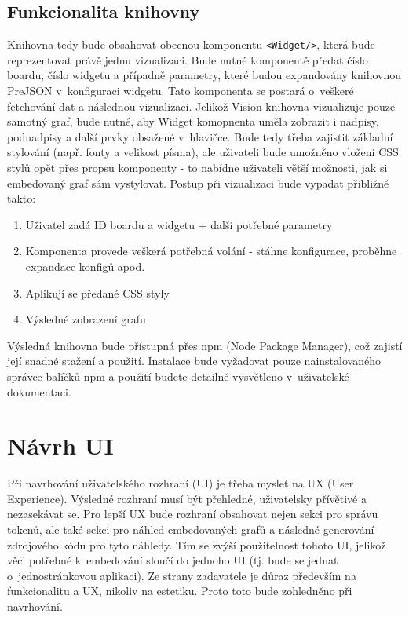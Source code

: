 \documentclass[czech, bc, kiv, he, iso690numb]{fasthesis}
\begin{document}
\subsection{Funkcionalita knihovny}
Knihovna tedy bude obsahovat obecnou komponentu \texttt{<Widget/>}, která bude reprezentovat právě jednu vizualizaci. Bude nutné komponentě předat číslo boardu, číslo widgetu a případně parametry, které 
budou expandovány knihovnou PreJSON v~konfiguraci widgetu. Tato komponenta se postará o~veškeré fetchování dat a následnou vizualizaci. Jelikož Vision knihovna vizualizuje pouze samotný graf, bude nutné, aby
Widget komopnenta uměla zobrazit i nadpisy, podnadpisy a další prvky obsažené v~hlavičce. Bude tedy třeba zajistit základní stylování (např. fonty a velikost písma), ale uživateli bude umožněno vložení CSS stylů
opět přes propsu komponenty - to nabídne uživateli větší možnosti, jak si embedovaný graf sám vystylovat. Postup při vizualizaci bude vypadat přibližně takto:

\begin{enumerate}
	\item Uživatel zadá ID boardu a widgetu + další potřebné parametry
	\item Komponenta provede veškerá potřebná volání - stáhne konfigurace, proběhne expandace konfigů apod.
	\item Aplikují se předané CSS styly 
	\item Výsledné zobrazení grafu
\end{enumerate}

Výsledná knihovna bude přístupná přes npm (Node Package Manager), což zajistí její snadné stažení a použití. Instalace bude vyžadovat pouze nainstalovaného správce balíčků npm a použití budete
detailně vysvětleno v~uživatelské dokumentaci.

\section{Návrh UI}

Při navrhování uživatelského rozhraní (UI) je třeba myslet na UX (User Experience). Výsledné rozhraní musí být přehledné, uživatelsky přívětivé a nezasekávat se. Pro lepší UX bude rozhraní 
obsahovat nejen sekci pro správu tokenů, ale také sekci pro náhled embedovaných grafů a následné generování zdrojového kódu pro tyto náhledy. Tím se zvýší použitelnost tohoto UI, jelikož 
věci potřebné k~embedování sloučí do jednoho UI (tj. bude se jednat o~jednostránkovou aplikaci). Ze strany zadavatele je důraz především na funkcionalitu a UX, nikoliv na estetiku. Proto toto bude zohledněno při navrhování.
\end{document}

